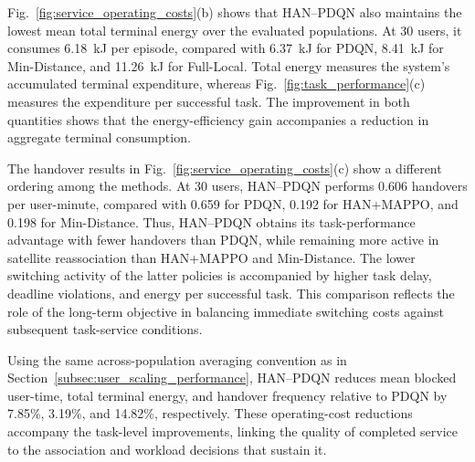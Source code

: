 Fig.~\ref{fig:service_operating_costs}(b) shows that
HAN--PDQN also maintains the lowest mean total
terminal energy over the evaluated populations.
At 30 users, it consumes 6.18~kJ per episode,
compared with 6.37~kJ for PDQN,
8.41~kJ for Min-Distance, and 11.26~kJ for Full-Local.
Total energy measures the system's accumulated
terminal expenditure, whereas
Fig.~\ref{fig:task_performance}(c) measures the
expenditure per successful task.
The improvement in both quantities shows that the
energy-efficiency gain accompanies a reduction in
aggregate terminal consumption.

The handover results in
Fig.~\ref{fig:service_operating_costs}(c) show a
different ordering among the methods.
At 30 users, HAN--PDQN performs 0.606 handovers per
user-minute, compared with 0.659 for PDQN,
0.192 for HAN+MAPPO, and 0.198 for Min-Distance.
Thus, HAN--PDQN obtains its task-performance advantage
with fewer handovers than PDQN, while remaining more
active in satellite reassociation than HAN+MAPPO
and Min-Distance.
The lower switching activity of the latter policies
is accompanied by higher task delay, deadline violations,
and energy per successful task.
This comparison reflects the role of the long-term
objective in balancing immediate switching costs
against subsequent task-service conditions.

Using the same across-population averaging convention
as in Section~\ref{subsec:user_scaling_performance},
HAN--PDQN reduces mean blocked user-time,
total terminal energy, and handover frequency relative
to PDQN by 7.85\%, 3.19\%, and 14.82\%, respectively.
These operating-cost reductions accompany the
task-level improvements, linking the quality of
completed service to the association and workload
decisions that sustain it.

\FloatBarrier



